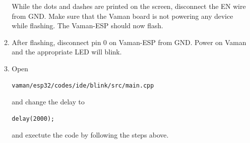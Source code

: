 \documentclass[12pt]{article}
\begin{document}
\begin{enumerate}[label=\thesection.\arabic*.,ref=\thesection.\theenumi]
While the dots and dashes are printed on the screen, disconnect the EN wire from GND.   Make sure that the Vaman board is not powering any device while flashing.  The Vaman-ESP should now flash.
\fi
\item After flashing, disconnect pin 0 on Vaman-ESP from GND. Power on Vaman and the appropriate LED will blink.
\item Open
\begin{lstlisting}
vaman/esp32/codes/ide/blink/src/main.cpp 
\end{lstlisting}
and change the delay to 
\begin{lstlisting}
delay(2000);
\end{lstlisting}
and exectute the code by following the steps above.
\end{enumerate}
\end{document}
